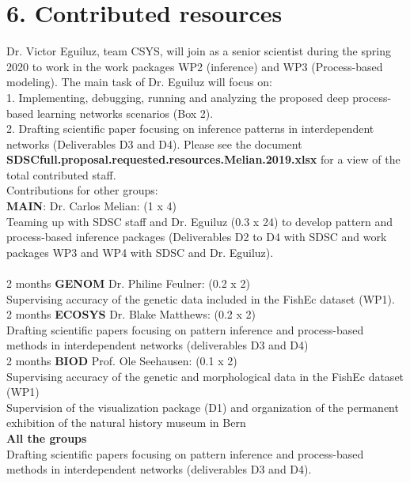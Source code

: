 \documentclass[11pt]{article}
\begin{document}
\section*{6. Contributed resources}
Dr. Victor Eguiluz, team CSYS, will join as a senior scientist during
the spring 2020 to work in the work packages WP2 (inference) and WP3
(Process-based modeling). The main task of Dr. Eguiluz will focus on:
\\
1. Implementing, debugging, running and analyzing the proposed deep
process-based learning networks scenarios (Box 2).
\\
2. Drafting scientific paper focusing on inference patterns in
interdependent networks (Deliverables D3 and D4). Please see the
document {\bf
  SDSC{full}.{proposal}.{requested}.{resources}.{Melian}.{2019}.xlsx}
for a view of the total contributed staff.
\\
Contributions for other groups:\\
{\bf MAIN}: Dr. Carlos Melian: (1 x 4)\\
Teaming up with SDSC staff and Dr. Eguiluz (0.3 x 24) to develop
pattern and process-based inference packages (Deliverables D2 to D4
with SDSC and work packages WP3 and WP4 with SDSC and Dr.
Eguiluz). \\
\\
2 months {\bf GENOM} Dr. Philine Feulner: (0.2 x 2)\\
Supervising accuracy of the genetic data included in the FishEc
dataset (WP1).
\\
2 months {\bf ECOSYS} Dr. Blake Matthews: (0.2 x 2)\\
Drafting scientific papers focusing on pattern inference and
process-based methods in interdependent networks (deliverables D3 and
D4)
\\
2 months {\bf BIOD} Prof. Ole Seehausen: (0.1 x 2)\\
Supervising accuracy of the genetic and morphological data in the
FishEc dataset (WP1)
\\
Supervision of the visualization package (D1) and organization of the
permanent exhibition of the natural history museum in Bern
\\
{\bf All the groups}\\
Drafting scientific papers focusing on pattern inference and
process-based methods in interdependent networks (deliverables D3 and
D4).


\newpage

%

\end{document}
